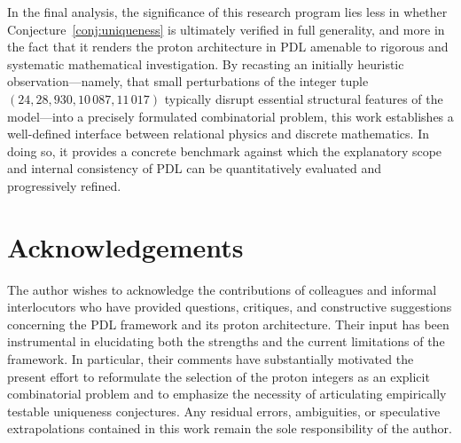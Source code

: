 \documentclass[11pt,a4paper]{article}
\begin{document}
In the final analysis, the significance of this research program lies less in whether Conjecture~\ref{conj:uniqueness} is ultimately verified in full generality, and more in the fact that it renders the proton architecture in PDL amenable to rigorous and systematic mathematical investigation. By recasting an initially heuristic observation—namely, that small perturbations of the integer tuple $(24,28,930,10\,087,11\,017)$ typically disrupt essential structural features of the model—into a precisely formulated combinatorial problem, this work establishes a well-defined interface between relational physics and discrete mathematics. In doing so, it provides a concrete benchmark against which the explanatory scope and internal consistency of PDL can be quantitatively evaluated and progressively refined.

\section*{Acknowledgements}

The author wishes to acknowledge the contributions of colleagues and informal interlocutors who have provided questions, critiques, and constructive suggestions concerning the PDL framework and its proton architecture. Their input has been instrumental in elucidating both the strengths and the current limitations of the framework. In particular, their comments have substantially motivated the present effort to reformulate the selection of the proton integers as an explicit combinatorial problem and to emphasize the necessity of articulating empirically testable uniqueness conjectures. Any residual errors, ambiguities, or speculative extrapolations contained in this work remain the sole responsibility of the author.



\end{document}
